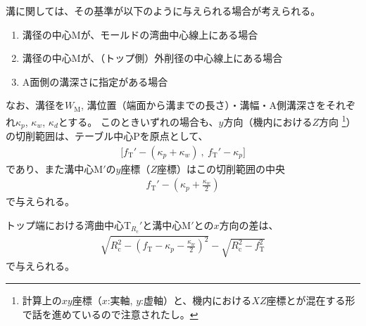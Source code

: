 溝に関しては、その基準が以下のように与えられる場合が考えられる。
\begin{enumerate}
\item {}溝径の中心Mが、モールドの湾曲中心線上にある場合
\item {}溝径の中心Mが、（トップ側）外削径の中心線上にある場合
\item {}A面側の溝深さに指定がある場合
\end{enumerate}
なお、溝径を$W_\mathrm M$, 溝位置（端面から溝までの長さ）・溝幅・A側溝深さをそれぞれ$\kappa_p$, $\kappa_w$, $\kappa_d$とする。
このときいずれの場合も、$y$方向（機内における$Z$方向
\footnote{計算上の$xy$座標（$x$:実軸, $y$:虚軸）と、機内における$XZ$座標とが混在する形で話を進めているので注意されたし。}）
の切削範囲は、テーブル中心Pを原点として、
\begin{align*}
  \big[f_\mathrm T'-(\kappa_p+\kappa_w)\ ,\ f_\mathrm T'-\kappa_p\big]
\end{align*}
であり、また溝中心M$'$の$y$座標（$Z$座標）はこの切削範囲の中央
\begin{align}
  \label{eq:mizocenterZ}
  f_\mathrm T'-\left(\kappa_p+\frac{\kappa_w}2\right)
\end{align}
で与えられる。



トップ端における湾曲中心T$_{R_\mathrm c}'$と溝中心M$'$との$x$方向の差は、
\begin{align}
  \label{eq:difTopMizoCenter}
  \sqrt{R_\mathrm c^2-\left(f_\mathrm T-\kappa_p-\frac{\kappa_w}2\right)^{\!2}}
  -\sqrt{R_\mathrm c^2-f_\mathrm T^2}
\end{align}
で与えられる。


